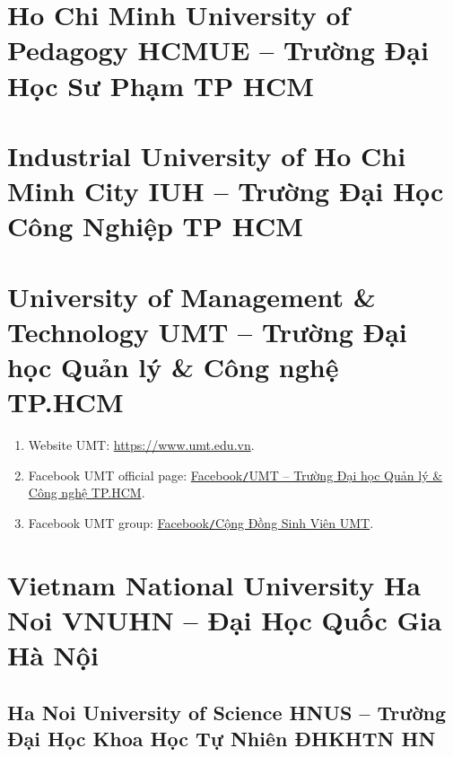 \documentclass{article}
\begin{document}

\section{Ho Chi Minh University of Pedagogy HCMUE -- Trường Đại Học Sư Phạm TP HCM}


\section{Industrial University of Ho Chi Minh City IUH -- Trường Đại Học Công Nghiệp TP HCM}


\section{University of Management \& Technology UMT -- Trường Đại học Quản lý \& Công nghệ TP.HCM}
\begin{enumerate}
	\item Website UMT: \url{https://www.umt.edu.vn}.
	\item Facebook UMT official page: \href{https://www.facebook.com/UMTUniversity}{Facebook{\tt/}UMT -- Trường Đại học Quản lý \& Công nghệ TP.HCM}.
	\item Facebook UMT group: \href{https://www.facebook.com/groups/690300442040851}{Facebook{\tt/}Cộng Đồng Sinh Viên UMT}.
\end{enumerate}


\section{Vietnam National University Ha Noi VNUHN -- Đại Học Quốc Gia Hà Nội}

\subsection{Ha Noi University of Science HNUS -- Trường Đại Học Khoa Học Tự Nhiên ĐHKHTN HN}

\end{document}
